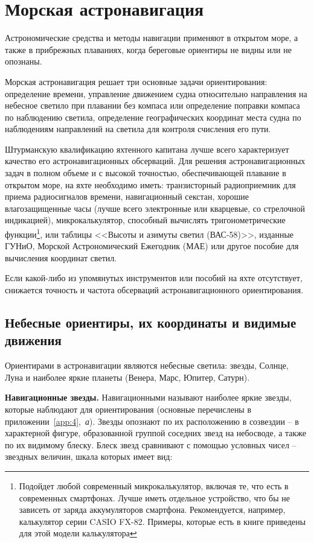 \twocolumn

\chapter{Морская астронавигация\label{chap:7}}

Астрономические средства и методы навигации применяют в открытом море,
а также в прибрежных плаваниях, когда береговые ориентиры не видны или
не опознаны.

Морская астронавигация решает три основные задачи ориентирования:
определение времени, управление движением судна относительно
направления на небесное светило при плавании без компаса или
определение поправки компаса по наблюдению светила, определение
географических координат места судна по наблюдениям направлений на
светила для контроля счисления его пути.

Штурманскую квалификацию яхтенного капитана лучше всего характеризует
качество его астронавигационных обсерваций. Для решения
астронавигационных задач в полном объеме и с высокой точностью,
обеспечивающей плавание в открытом море, на яхте необходимо иметь:
транзисторный радиоприемник для приема радиосигналов времени,
навигационный секстан, хорошие влагозащищенные часы (лучше всего
электронные или кварцевые, со стрелочной индикацией),
микрокалькулятор, способный вычислять тригонометрические
функции\footnote{Подойдет любой современный микрокалькулятор, включая
  те, что есть в современных смартфонах. Лучше иметь отдельное
  устройство, что бы не зависеть от заряда аккумуляторов смартфона.
  Рекомендуется, например, калькулятор серии CASIO FX-82. Примеры,
  которые есть в книге приведены для этой модели калькулятора}, или
таблицы <<Высоты и азимуты светил (ВАС-58)>>, изданные ГУНиО, Морской
Астрономический Ежегодник (МАЕ) или другое пособие для вычисления
координат светил.

Если какой-либо из упомянутых инструментов или пособий на яхте
отсутствует, снижается точность и частота обсерваций
астронавигационного ориентирования.

\section{Небесные ориентиры, их координаты и видимые движения\label{sec:7-1}}

Ориентирами в астронавигации являются небесные светила: звезды,
Солнце, Луна и наиболее яркие планеты (Венера, Марс, Юпитер, Сатурн).

\textbf{Навигационные звезды.} Навигационными называют наиболее яркие
звезды, которые наблюдают для ориентирования (основные перечислены в
приложении~\ref{app:4},~\textit{а}). Звезды опознают по их
расположению в созвездии \--- в характерной фигуре, образованной
группой соседних звезд на небосводе, а также по их видимому блеску.
Блеск звезд сравнивают с помощью условных чисел \--- звездных величин,
шкала которых имеет вид:

